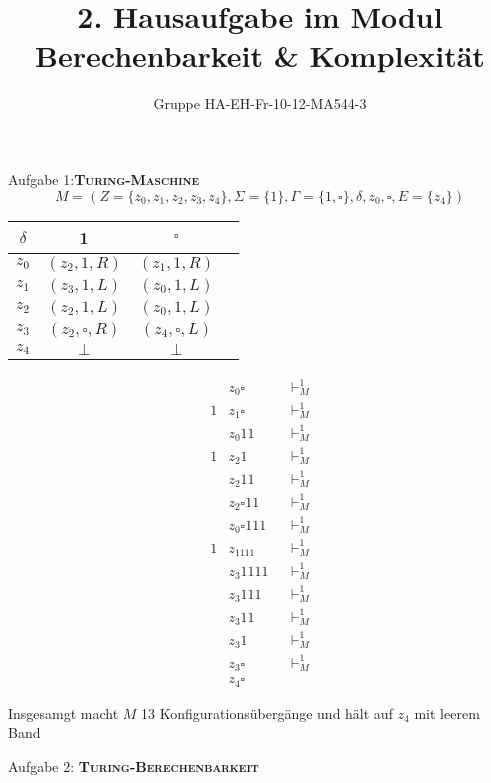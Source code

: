 \documentclass[a4paper,onecolumn,oneside,12pt,ngerman]{article}
\date{}
\title{2. Hausaufgabe im Modul \\ \glqq Berechenbarkeit \& Komplexität\grqq} %
\author{Gruppe HA-EH-Fr-10-12-MA544-3} %
\theoremstyle{plain} %
\theoremstyle{definition} %
\theoremstyle{remark} %
\theoremstyle{plain}
\newcommand{\tstep}[1][1]{\vdash^#1_M} %
\begin{document}

\maketitle
\newpage

Aufgabe 1:\quad \textsc{\textbf{Turing-Maschine}}
\[ M = (Z = \{z_0, z_1, z_2, z_3, z_4\}, \Sigma = \{1\}, \Gamma = \{1,\square\},\delta, z_0, \square, E = \{z_4\}) \]

\begin{center}
	\begin{tabular}{c|ccc}
	$\delta$ & 1           & $\square$ \\ \hline
	$z_0$    & $(z_2,1,R)$ & $(z_1,1,R)$\\
	$z_1$    & $(z_3,1,L)$ & $(z_0,1,L)$\\
	$z_2$    & $(z_2,1,L)$ & $(z_0,1,L)$\\
	$z_3$    & $(z_2,\square, R)$ & $(z_4,\square,L)$\\
	$z_4$    & $\bot$ & $\bot$\\
	\end{tabular}
\end{center}

\begin{align*}
  &z_0 \square  &&\tstep  \\
  1&z_1 \square  &&\tstep  \\
  &z_0 11    &&\tstep  \\
  1&z_2 1     &&\tstep  \\
  &z_2 11    &&\tstep  \\
  &z_2 \square11   &&\tstep  \\
  &z_0 \square111  &&\tstep  \\
  1&z_1111  &&\tstep \\
  &z_3 1111  &&\tstep \\
  &z_3 111  &&\tstep \\
  &z_3 11  &&\tstep \\
  &z_3 1  &&\tstep \\
  &z_3 \square  &&\tstep \\
  &z_4 \square  
\end{align*}

Insgesamgt macht $M$ 13 Konfigurationsübergänge und hält auf $z_4$ mit leerem Band

\newpage
Aufgabe 2: \quad \textsc{\textbf{Turing-Berechenbarkeit}}
\end{document}
